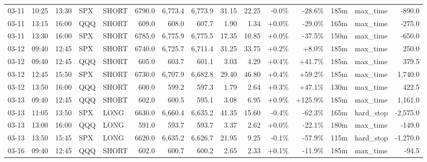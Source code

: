 \documentclass[11pt,a4paper,twoside]{article}
\begin{document}
\begin{landscape}
\begin{center}
\begin{longtable}{>{\color{txtmain}}l l l l l r r r r r r r r >{\color{txtmain}}l r}
03-11 & 10:25 & 13:30 & SPX & SHORT & 6790.0 & 6,773.4 & 6,773.9 & 31.15 & 22.25 & \textcolor{lossred}{-0.0\%} & \textcolor{lossred}{-28.6\%} & 185m & max\_time & \textcolor{lossred}{-890.0} \\
03-11 & 13:15 & 16:00 & QQQ & SHORT & 609.0 & 608.0 & 607.7 & 1.90 & 1.34 & \textcolor{wingreen}{+0.0\%} & \textcolor{lossred}{-29.0\%} & 165m & max\_time & \textcolor{lossred}{-275.0} \\
03-11 & 13:30 & 16:00 & SPX & SHORT & 6785.0 & 6,775.9 & 6,775.5 & 17.35 & 10.85 & \textcolor{wingreen}{+0.0\%} & \textcolor{lossred}{-37.5\%} & 150m & max\_time & \textcolor{lossred}{-650.0} \\
03-12 & 09:40 & 12:45 & SPX & SHORT & 6740.0 & 6,725.7 & 6,711.4 & 31.25 & 33.75 & \textcolor{wingreen}{+0.2\%} & \textcolor{wingreen}{+8.0\%} & 185m & max\_time & \textcolor{wingreen}{250.0} \\
03-12 & 09:40 & 12:45 & QQQ & SHORT & 605.0 & 603.7 & 601.1 & 3.03 & 4.29 & \textcolor{wingreen}{+0.4\%} & \textcolor{wingreen}{+41.7\%} & 185m & max\_time & \textcolor{wingreen}{379.5} \\
03-12 & 12:45 & 15:50 & SPX & SHORT & 6730.0 & 6,707.9 & 6,682.8 & 29.40 & 46.80 & \textcolor{wingreen}{+0.4\%} & \textcolor{wingreen}{+59.2\%} & 185m & max\_time & \textcolor{wingreen}{1,740.0} \\
03-12 & 13:50 & 16:00 & QQQ & SHORT & 600.0 & 599.2 & 597.3 & 1.79 & 2.64 & \textcolor{wingreen}{+0.3\%} & \textcolor{wingreen}{+47.1\%} & 130m & max\_time & \textcolor{wingreen}{422.5} \\
03-13 & 09:40 & 12:45 & QQQ & SHORT & 602.0 & 600.5 & 595.1 & 3.08 & 6.95 & \textcolor{wingreen}{+0.9\%} & \textcolor{wingreen}{+125.9\%} & 185m & max\_time & \textcolor{wingreen}{1,161.0} \\
03-13 & 11:05 & 13:50 & SPX & LONG & 6630.0 & 6,660.4 & 6,635.2 & 41.35 & 15.60 & \textcolor{lossred}{-0.4\%} & \textcolor{lossred}{-62.3\%} & 165m & hard\_stop & \textcolor{lossred}{-2,575.0} \\
03-13 & 13:00 & 16:00 & QQQ & LONG & 591.0 & 593.7 & 593.7 & 3.37 & 2.62 & \textcolor{wingreen}{+0.0\%} & \textcolor{lossred}{-22.1\%} & 180m & max\_time & \textcolor{lossred}{-149.0} \\
03-13 & 13:50 & 15:45 & SPX & LONG & 6620.0 & 6,635.2 & 6,626.7 & 21.95 & 9.25 & \textcolor{lossred}{-0.1\%} & \textcolor{lossred}{-57.9\%} & 115m & hard\_stop & \textcolor{lossred}{-1,270.0} \\
03-16 & 09:40 & 12:45 & QQQ & SHORT & 602.0 & 600.7 & 600.2 & 2.65 & 2.33 & \textcolor{wingreen}{+0.1\%} & \textcolor{lossred}{-11.9\%} & 185m & max\_time & \textcolor{lossred}{-94.5} \\

\end{longtable}
\end{center}
\end{landscape}
\end{document}
